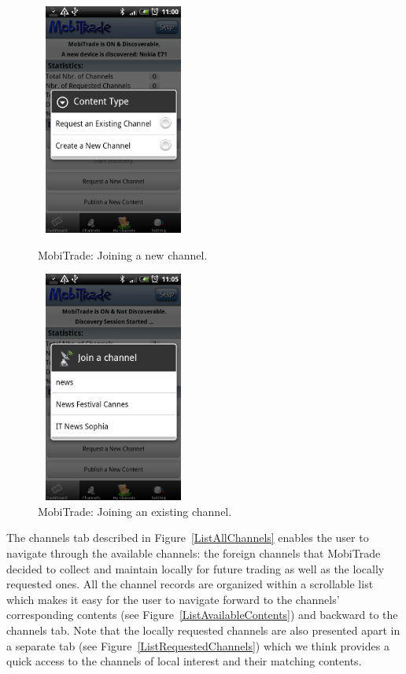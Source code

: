 \begin{figure}[!h]
\begin{minipage}[l]{0.3\linewidth}
\centering
\includegraphics[width=2in,height=3in]{Chapitre6/JoinChannel.png}
\begin{minipage}[l]{1\linewidth}
\small
\caption{MobiTrade: Joining a new channel.}
\normalsize
\label{JoiningNewChannel}
\end{minipage}
\end{minipage}
\hspace{2.1cm}
\begin{minipage}[l]{0.3\linewidth}
\centering
\includegraphics[width=2in,height=3in]{Chapitre6/JoinExistingChannel.png}
\begin{minipage}[l]{1\linewidth}
\caption{MobiTrade: Joining an existing channel.}
\label{JoiningExistingChannel}
\end{minipage}
\end{minipage}
\end{figure}

The channels tab described in Figure~\ref{ListAllChannels} enables the user to navigate through the available channels: the foreign channels that MobiTrade decided to collect and maintain locally for future trading as well as the locally requested ones. All the channel records are organized within a scrollable list which makes it easy for the user to navigate forward to the channels' corresponding contents (see Figure~\ref{ListAvailableContents}) and backward to the channels tab. Note that the locally requested channels are also presented apart in a separate tab (see Figure~\ref{ListRequestedChannels}) which we think provides a quick access to the channels of local interest and their matching contents.

